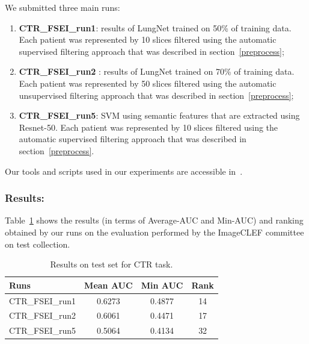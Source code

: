 \documentclass{llncs}
\begin{document}
We submitted three main runs:
\begin{enumerate}
\item  \textbf{CTR\_FSEI\_run1}:  results of LungNet trained on 50\% of training data. Each patient was represented by 10 slices filtered using the automatic supervised filtering approach that was described in section~\ref{preprocess};
\item  \textbf{CTR\_FSEI\_run2} :  results of LungNet trained on 70\% of training data. Each patient was represented by 50 slices filtered using the automatic unsupervised filtering approach that was described in section~\ref{preprocess};
\item  \textbf{CTR\_FSEI\_run5}: SVM using semantic features that are extracted using Resnet-50. Each patient was represented by 10 slices filtered using the automatic supervised filtering approach that was described in section~\ref{preprocess}.\\
\end{enumerate}

Our tools and scripts used in our experiments are accessible in~\cite{anouargit}.

\subsubsection{Results:}


Table~\ref{tab:resultstestctr} shows the results (in terms of Average-AUC and Min-AUC) and ranking obtained by our runs on the evaluation performed by the ImageCLEF committee on test collection.\\

\begin{table}
\center
\caption{Results on test set for CTR task.}
\label{tab:resultstestctr}
\begin{tabular}{|l||c||c||c|}
\hline
Runs                    &    Mean AUC    &    Min AUC    &    Rank        \\
\hline
CTR\_FSEI\_run1                &     0.6273        &    0.4877    &    14        \\
CTR\_FSEI\_run2                &     0.6061        &    0.4471    &    17        \\
CTR\_FSEI\_run5                &     0.5064        &    0.4134    &    32        \\
\hline
\end{tabular}
\end{table}
\end{document}
